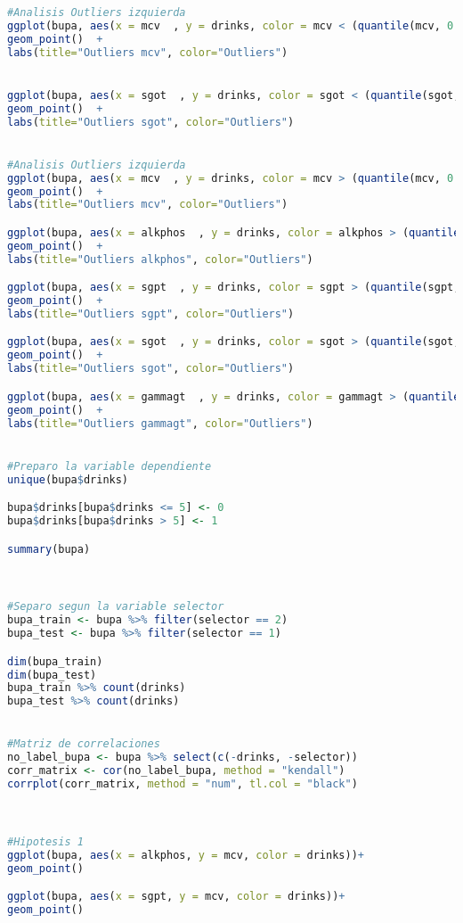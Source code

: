 \begin{lstlisting}[language=R]
#Analisis Outliers izquierda
ggplot(bupa, aes(x = mcv  , y = drinks, color = mcv < (quantile(mcv, 0.25) - IQR(mcv)*1.5) )) +
geom_point()  +
labs(title="Outliers mcv", color="Outliers")


ggplot(bupa, aes(x = sgot  , y = drinks, color = sgot < (quantile(sgot, 0.25) - IQR(sgot)*1.5) )) +
geom_point()  +
labs(title="Outliers sgot", color="Outliers")


#Analisis Outliers izquierda
ggplot(bupa, aes(x = mcv  , y = drinks, color = mcv > (quantile(mcv, 0.75) + IQR(mcv)*1.5) )) +
geom_point()  +
labs(title="Outliers mcv", color="Outliers")

ggplot(bupa, aes(x = alkphos  , y = drinks, color = alkphos > (quantile(alkphos, 0.75) + IQR(alkphos)*1.5) )) +
geom_point()  +
labs(title="Outliers alkphos", color="Outliers")

ggplot(bupa, aes(x = sgpt  , y = drinks, color = sgpt > (quantile(sgpt, 0.75) + IQR(sgpt)*1.5) )) +
geom_point()  +
labs(title="Outliers sgpt", color="Outliers")

ggplot(bupa, aes(x = sgot  , y = drinks, color = sgot > (quantile(sgot, 0.75) + IQR(sgot)*1.5) )) +
geom_point()  +
labs(title="Outliers sgot", color="Outliers")

ggplot(bupa, aes(x = gammagt  , y = drinks, color = gammagt > (quantile(gammagt, 0.75) + IQR(gammagt)*1.5) )) +
geom_point()  +
labs(title="Outliers gammagt", color="Outliers")


#Preparo la variable dependiente
unique(bupa$drinks)

bupa$drinks[bupa$drinks <= 5] <- 0
bupa$drinks[bupa$drinks > 5] <- 1

summary(bupa)



#Separo segun la variable selector
bupa_train <- bupa %>% filter(selector == 2)
bupa_test <- bupa %>% filter(selector == 1)

dim(bupa_train)
dim(bupa_test)
bupa_train %>% count(drinks)
bupa_test %>% count(drinks)


#Matriz de correlaciones
no_label_bupa <- bupa %>% select(c(-drinks, -selector))
corr_matrix <- cor(no_label_bupa, method = "kendall")
corrplot(corr_matrix, method = "num", tl.col = "black")



#Hipotesis 1
ggplot(bupa, aes(x = alkphos, y = mcv, color = drinks))+
geom_point() 

ggplot(bupa, aes(x = sgpt, y = mcv, color = drinks))+
geom_point() 


\end{lstlisting}
